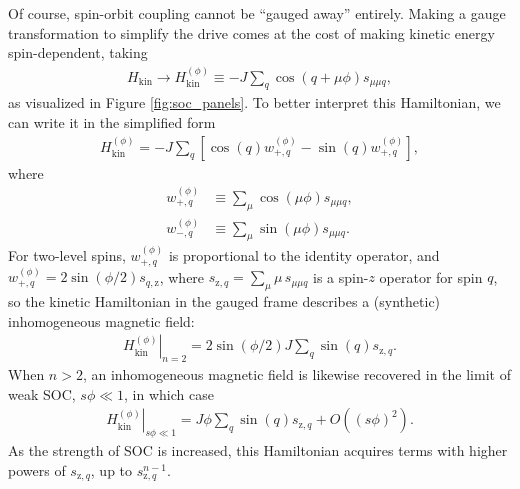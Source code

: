 \documentclass[nofootinbib,twocolumn]{revtex4-2}
\renewcommand{\t}{\text} %
\newcommand{\p}[1]{\left(#1\right)} %
\renewcommand{\sp}[1]{\left[#1\right]} %
\newcommand{\1}{\mathds{1}}
\newcommand{\z}{\text{z}}
\begin{document}
Of course, spin-orbit coupling cannot be ``gauged away'' entirely.
Making a gauge transformation to simplify the drive comes at the cost of making kinetic energy spin-dependent, taking
\begin{align}
  H_{\t{kin}} \to H_{\t{kin}}^{(\phi)}
  \equiv -J \sum_q \cos\p{q+\mu\phi} s_{\mu\mu q},
\end{align}
as visualized in Figure \ref{fig:soc_panels}.
To better interpret this Hamiltonian, we can write it in the simplified form
\begin{align}
  H_{\t{kin}}^{(\phi)}
  = -J \sum_q
  \sp{\cos\p{q} w_{+,q}^{(\phi)} - \sin\p{q} w_{+,q}^{(\phi)}},
\end{align}
where
\begin{align}
  w_{+,q}^{(\phi)} &\equiv \sum_\mu \cos\p{\mu\phi} s_{\mu\mu q}, \\
  w_{-,q}^{(\phi)} &\equiv \sum_\mu \sin\p{\mu\phi} s_{\mu\mu q}.
\end{align}
For two-level spins, $w_{+,q}^{(\phi)}$ is proportional to the identity operator, and $w_{+,q}^{(\phi)}=2\sin\p{\phi/2} s_{q,\z}$, where $s_{\z,q}=\sum_\mu \mu\, s_{\mu\mu q}$ is a spin-$z$ operator for spin $q$, so the kinetic Hamiltonian in the gauged frame describes a (synthetic) inhomogeneous magnetic field:
\begin{align}
  \left. H_{\t{kin}}^{(\phi)} \right|_{n=2}
  = 2\sin\p{\phi/2} J \sum_q \sin\p{q} s_{\z,q}.
\end{align}
When $n>2$, an inhomogeneous magnetic field is likewise recovered in the limit of weak SOC, $s\phi\ll1$, in which case
\begin{align}
  \left. H_{\t{kin}}^{(\phi)} \right|_{s\phi\ll1}
  = J\phi \sum_q \sin\p{q} s_{\z,q} + O\p{(s\phi)^2}.
\end{align}
As the strength of SOC is increased, this Hamiltonian acquires terms with higher powers of $s_{\z,q}$, up to $s_{\z,q}^{n-1}$.
\end{document}

